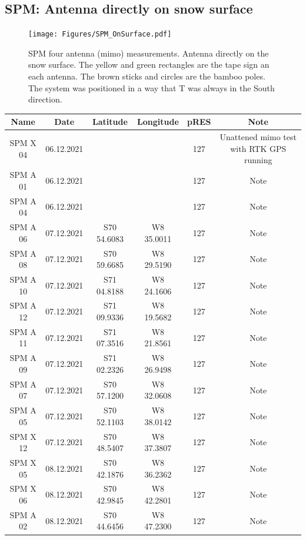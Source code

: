 \documentclass[a4paper,12pt]{article}
\begin{document}
\subsection{SPM: Antenna directly on snow surface}
\begin{figure}[H]
	\texttt{[image: Figures/SPM\_OnSurface.pdf]}
	\caption{SPM four antenna (mimo) measurements. Antenna directly on the snow surface.
  The yellow and green rectangles are the tape sign an each antenna. 
  The brown sticks and circles are the bamboo poles.
  The system was positioned in a way that T was always in the South direction.}
	\label{fig_SPM_surface}
\end{figure}

\begin{table}[H]
  \tiny
  \centering
  \begin{tabular}[width=\textwidth]{c c c c c c}
    \rowcolor{gray!50}
    Name & Date & Latitude & Longitude & pRES & Note\\
    \hline
    SPM X 04 & 06.12.2021 &  &  & 127 & Unattened mimo test with RTK GPS running \\ 
    SPM A 01 & 06.12.2021 &  &  & 127 & Note \\
    SPM A 04 & 06.12.2021 &  &  & 127 & Note \\
    SPM A 06 & 07.12.2021 & S70 54.6083 & W8 35.0011 & 127 & Note \\
    SPM A 08 & 07.12.2021 & S70 59.6685 & W8 29.5190 & 127 & Note \\
    SPM A 10 & 07.12.2021 & S71 04.8188 & W8 24.1606 & 127 & Note \\
    SPM A 12 & 07.12.2021 & S71 09.9336 & W8 19.5682 & 127 & Note \\
    SPM A 11 & 07.12.2021 & S71 07.3516 & W8 21.8561 & 127 & Note \\
    SPM A 09 & 07.12.2021 & S71 02.2326 & W8 26.9498 & 127 & Note \\
    SPM A 07 & 07.12.2021 & S70 57.1200 & W8 32.0608 & 127 & Note \\
    SPM A 05 & 07.12.2021 & S70 52.1103 & W8 38.0142 & 127 & Note \\
    SPM X 12 & 07.12.2021 & S70 48.5407 & W8 37.3807 & 127 & Note \\
    SPM X 05 & 08.12.2021 & S70 42.1876 & W8 36.2362 & 127 & Note \\
    SPM X 06 & 08.12.2021 & S70 42.9845 & W8 42.2801 & 127 & Note \\
    SPM A 02 & 08.12.2021 & S70 44.6456 & W8 47.2300 & 127 & Note \\

\end{tabular}
\end{table}
\end{document}
